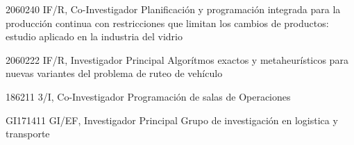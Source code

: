 {2060240 IF/R, Co-Investigador}
{Planificaci\'on y programaci\'on integrada para la producci\'on continua con restricciones que limitan los cambios de productos: estudio aplicado en la industria del vidrio}

{2060222 IF/R, Investigador Principal}
{Algor\'itmos exactos y metaheur\'isticos para nuevas variantes del problema de ruteo de veh\'iculo}

{186211 3/I, Co-Investigador}
{Programaci\'on de salas de Operaciones}

{GI171411 GI/EF, Investigador Principal}
{Grupo de investigaci\'on en logistica y transporte}

\clearpage